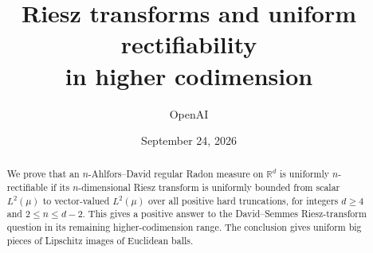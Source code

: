 \documentclass[11pt]{article}
\title{Riesz transforms and uniform rectifiability\\in higher codimension}
\author{OpenAI}
\date{September 24, 2026}
\newcommand{\R}{\mathbb R}
\theoremstyle{definition}
\theoremstyle{remark}
\numberwithin{equation}{section}
\begin{document}
\maketitle
\begin{abstract}
We prove that an $n$-Ahlfors--David regular Radon measure on $\R^d$
is uniformly $n$-rectifiable if its $n$-dimensional Riesz transform is
uniformly bounded from scalar $L^2(\mu)$ to vector-valued $L^2(\mu)$
over all positive hard truncations, for integers $d\ge4$ and
$2\le n\le d-2$.
This gives a positive answer to the David--Semmes Riesz-transform question
in its remaining higher-codimension range. The conclusion gives uniform
big pieces of Lipschitz images of Euclidean balls.
\end{abstract}
\tableofcontents









\appendix



\end{document}
